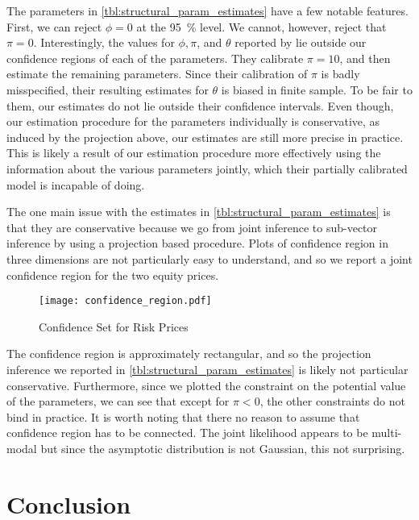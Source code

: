 \documentclass[11pt, letterpaper, twoside]{article}
\begin{document}
The parameters in \cref{tbl:structural_param_estimates} have a few notable features.  First, we can reject $\phi = 0$ at the \SI{95}{\percent} level.  We cannot, however, reject that $\pi = 0$.  Interestingly, the values for $\phi, \pi$, and $\theta$ reported by \textcite{han2018leverage} lie outside our confidence regions of each of the parameters. They calibrate $\pi = 10$, and then estimate the remaining parameters. Since their calibration of $\pi$ is badly  misspecified, their resulting estimates for $\theta$ is biased in finite sample. To be fair to them, our estimates do not lie outside their confidence intervals. Even though, our estimation procedure for the parameters individually is  conservative, as induced by the projection above, our estimates are still more precise in practice.  This is likely a result of our estimation procedure more effectively using the information about the various parameters jointly, which their partially calibrated model is incapable of doing.

The one main issue with the estimates in \cref{tbl:structural_param_estimates} is that they are conservative because we go from joint inference to sub-vector inference by using a projection based procedure.  Plots of confidence region in three dimensions are not particularly easy to understand, and so we report a joint confidence region for the two equity prices.


\begin{figure}[htb]

    \centering
    \caption{Confidence Set for Risk Prices}
    \label{fig:confidence_region}

    \texttt{[image: confidence\_region.pdf]}
\end{figure}

The confidence region is approximately rectangular, and so the projection inference we reported in \cref{tbl:structural_param_estimates} is likely not particular conservative. Furthermore, since we plotted the constraint on the potential value of the parameters, we can see that except for $\pi < 0$, the other constraints do not bind in practice. It is worth noting that there no reason to assume that confidence region has to be connected. The joint likelihood appears to be multi-modal but since the asymptotic distribution is not Gaussian, this not surprising.


\section{Conclusion}
\end{document}
